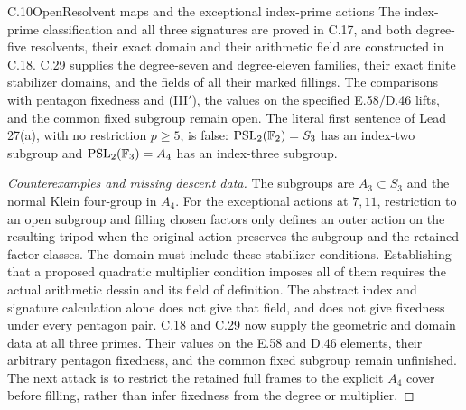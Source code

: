 \begin{statement}{C.10}{Open}{Resolvent maps and the exceptional index-prime actions}
The index-prime classification and all three signatures are
proved in C.17, and both degree-five resolvents, their exact
domain and their arithmetic field are constructed in C.18.
C.29 supplies the degree-seven and degree-eleven families,
their exact finite stabilizer domains, and the fields of
all their marked fillings. The comparisons with pentagon
fixedness and (III$'$), the values on the specified
E.58/D.46 lifts, and the common fixed subgroup remain open.
The literal first
sentence of Lead 27(a), with no restriction $p\geq5$, is false:
$\operatorname{PSL}_2(\mathbb F_2)=S_3$ has an index-two subgroup and
$\operatorname{PSL}_2(\mathbb F_3)=A_4$ has an index-three subgroup.
\end{statement}
\begin{proof}[Counterexamples and missing descent data]
The subgroups are $A_3\subset S_3$ and the normal Klein four-group
in $A_4$. For the exceptional actions at $7,11$, restriction to
an open subgroup and filling chosen factors only defines an outer
action on the resulting tripod when the original action preserves
the subgroup and the retained factor classes. The domain must
include these stabilizer conditions. Establishing that a proposed
quadratic multiplier condition imposes all of them requires the
actual arithmetic dessin and its field of definition. The abstract
index and signature calculation alone does not give that field,
and does not give fixedness under every pentagon pair. C.18
and C.29 now supply the geometric and domain data at all
three primes. Their values on the E.58 and D.46 elements,
their arbitrary pentagon fixedness, and the common fixed
subgroup remain unfinished. The next attack is to restrict the retained
full frames to the explicit $A_4$ cover before filling,
rather than infer fixedness from the degree or multiplier.
\end{proof}

